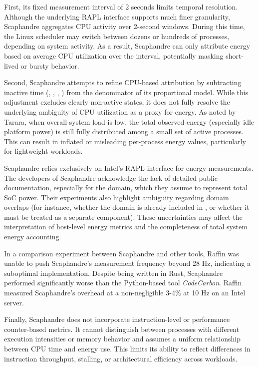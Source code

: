 First, its fixed measurement interval of 2 seconds limits temporal resolution. Although the underlying RAPL interface supports much finer granularity, Scaphandre aggregates CPU activity over 2-second windows. During this time, the Linux scheduler may switch between dozens or hundreds of processes, depending on system activity. As a result, Scaphandre can only attribute energy based on average CPU utilization over the interval, potentially masking short-lived or bursty behavior.

Second, Scaphandre attempts to refine CPU-based attribution by subtracting inactive time (, , , ) from the denominator of its proportional model. While this adjustment excludes clearly non-active states, it does not fully resolve the underlying ambiguity of CPU utilization as a proxy for energy. As noted by Tarara\parencite{Tarara2023CpuUtilization}, when overall system load is low, the total observed energy (especially idle platform power) is still fully distributed among a small set of active processes. This can result in inflated or misleading per-process energy values, particularly for lightweight workloads.

Scaphandre relies exclusively on Intel’s RAPL interface for energy measurements. The developers of Scaphandre acknowledge the lack of detailed public documentation, especially for the  domain, which they assume to represent total SoC power. Their experiments also highlight ambiguity regarding domain overlaps (for instance, whether the  domain is already included in , or whether it must be treated as a separate component). These uncertainties may affect the interpretation of host-level energy metrics and the completeness of total system energy accounting.

In a comparison experiment between Scaphandre and other tools, Raffin\parencite{raffin2024dissecting} was unable to push Scaphandre's measurement frequency beyond 28 Hz, indicating a suboptimal implementation. Despite being written in Rust, Scaphandre performed significantly worse than the Python-based tool \textit{CodeCarbon}. Raffin measured Scaphandre's overhead at a non-negligible 3-4\% at 10 Hz on an Intel server.

Finally, Scaphandre does not incorporate instruction-level or performance counter-based metrics. It cannot distinguish between processes with different execution intensities or memory behavior and assumes a uniform relationship between CPU time and energy use. This limits its ability to reflect differences in instruction throughput, stalling, or architectural efficiency across workloads.

